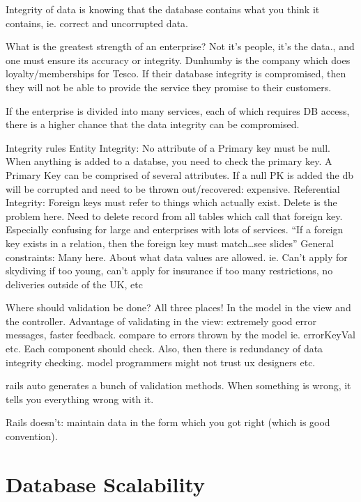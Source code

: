 \documentclass[11pt]{article}
\begin{document}
Integrity of data is knowing that the database contains what you think it contains, ie. correct and uncorrupted data.

What is the greatest strength of an enterprise? Not it’s people, it’s the data., and one must ensure its accuracy or integrity. Dunhumby is the company which does loyalty/memberships for Tesco. If their database integrity is compromised, then they will not be able to provide the service they promise to their customers.

If the enterprise is divided into many services, each of which requires DB access, there is a higher chance that the data integrity can be compromised.

Integrity rules
Entity Integrity: No attribute of a Primary key must be null. When anything is added to a databse, you need to check the primary key. A Primary Key can be comprised of several attributes. If a null PK is added the db will be corrupted and need to be thrown out/recovered: expensive.
Referential Integrity: Foreign keys must refer to things which actually exist. Delete is the problem here. Need to delete record from all tables which call that foreign key. Especially confusing for large and enterprises with lots of services. “If a foreign key exists in a relation, then the foreign key must match…see slides”
General constraints: Many here. About what data values are allowed. ie. Can’t apply for skydiving if too young, can’t apply for insurance if too many restrictions, no deliveries outside of the UK, etc

Where should validation be done?
All three places! In the model in the view and the controller. Advantage of validating in the view: extremely good error messages, faster feedback. compare to errors thrown by the model ie. errorKeyVal etc. Each component should check. Also, then there is redundancy of data integrity checking. model programmers might not trust ux designers etc.

rails auto generates a bunch of validation methods. When something is wrong, it tells you everything wrong with it.

Rails doesn’t: maintain data in the form  which you got right (which is good convention).


\section{Database Scalability}
\end{document}
